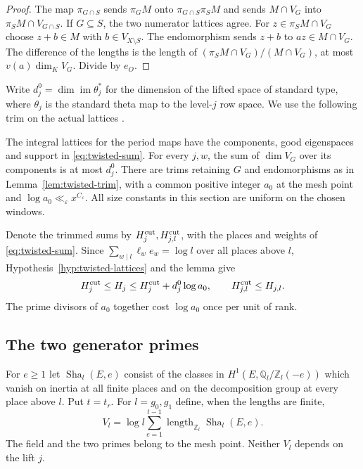 \begin{proof}
The map $\pi_{G\cap S}$ sends $\pi_G M$ onto
$\pi_{G\cap S}\pi_S M$ and sends $M\cap V_G$ into $\pi_S M\cap V_{G\cap S}$.
If $G\subseteq S$, the two numerator lattices agree. For
$z\in\pi_S M\cap V_G$ choose $z+b\in M$ with $b\in V_{X\setminus S}$.
The endomorphism sends $z+b$ to $az\in M\cap V_G$. The difference
of the lengths is the length of $(\pi_S M\cap V_G)/(M\cap V_G)$,
at most $v(a)\dim_K V_G$. Divide by $e_O$.
\end{proof}

Write $d_j^0=\dim\operatorname{im}\theta_j^*$ for the dimension of
the lifted space of standard type, where $\theta_j$ is the standard
theta map to the level-$j$ row space. We use the following trim on
the actual lattices \citep[Propositions~17.32--17.35]{adriazola-grh}
\citep{kimi-defect,kimi-generator}.

\begin{hypothesis}[\openinput]\label{hyp:twisted-lattices}
The integral lattices for the period maps have the components, good
eigenspaces and support in \eqref{eq:twisted-sum}. For every $j,w$,
the sum of $\dim V_G$ over its components is at most $d_j^0$.
There are trims retaining $G$ and endomorphisms as in
Lemma~\ref{lem:twisted-trim}, with a common positive integer $a_0$
at the mesh point and $\log a_0\ll_\varepsilon x^{C_\varepsilon}$.
All size constants in this section are uniform on the chosen windows.
\end{hypothesis}

Denote the trimmed sums by $H_j^{\rm cut},H_{j,l}^{\rm cut}$, with
the places and weights of \eqref{eq:twisted-sum}. Since
$\sum_{w\mid l}\ell_we_w=\log l$ over all places above $l$,
Hypothesis~\ref{hyp:twisted-lattices} and the lemma give
\begin{equation}\label{eq:twisted-trim}
  H_j^{\rm cut}\le H_j\le H_j^{\rm cut}+d_j^0\log a_0,\qquad
  H_{j,l}^{\rm cut}\le H_{j,l}.
\end{equation}
The prime divisors of $a_0$ together cost $\log a_0$ once per unit of rank.

\subsection{The two generator primes}

For $e\ge1$ let $\operatorname{Sha}_l(E,e)$ consist of the classes in
$H^1(E,\mathbb Q_l/\mathbb Z_l(-e))$ which vanish on inertia at all
finite places and on the decomposition group at every place above $l$.
Put $t=t_r$. For $l=g_0,g_1$ define, when the lengths are finite,
\[
 V_l=\log l\sum_{e=1}^{t-1}
                 \operatorname{length}_{\mathbb Z_l}\operatorname{Sha}_l(E,e).
\]
The field and the two primes belong to the mesh point. Neither $V_l$
depends on the lift $j$.

